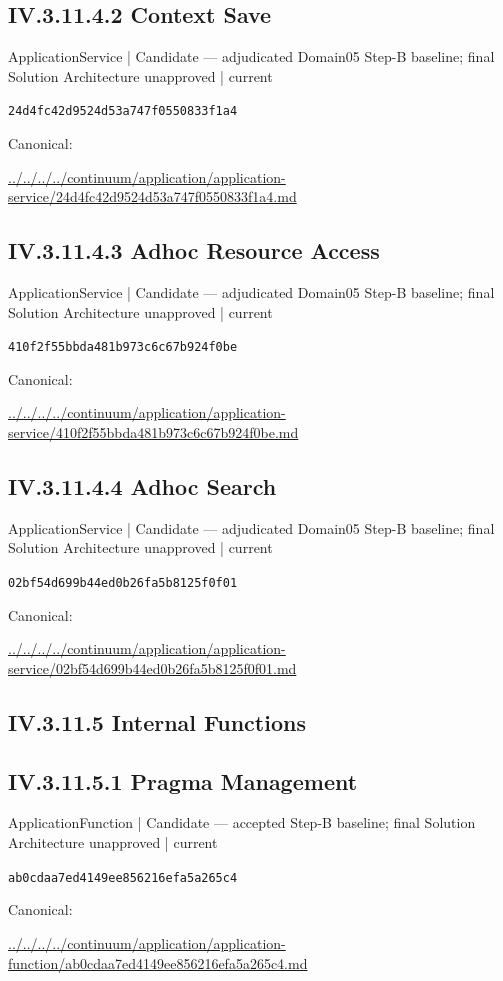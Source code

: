 \documentclass[10pt,a4paper]{article}
\begin{document}
\subsection*{IV.3.11.4.2 Context Save}
{\small ApplicationService | Candidate — adjudicated Domain05 Step-B baseline; final Solution Architecture unapproved | current}\par
\texttt{24d4fc42d9524d53a747f0550833f1a4}\par
Canonical: \par
{\footnotesize\url{../../../../continuum/application/application-service/24d4fc42d9524d53a747f0550833f1a4.md}}\par
\subsection*{IV.3.11.4.3 Adhoc Resource Access}
{\small ApplicationService | Candidate — adjudicated Domain05 Step-B baseline; final Solution Architecture unapproved | current}\par
\texttt{410f2f55bbda481b973c6c67b924f0be}\par
Canonical: \par
{\footnotesize\url{../../../../continuum/application/application-service/410f2f55bbda481b973c6c67b924f0be.md}}\par
\subsection*{IV.3.11.4.4 Adhoc Search}
{\small ApplicationService | Candidate — adjudicated Domain05 Step-B baseline; final Solution Architecture unapproved | current}\par
\texttt{02bf54d699b44ed0b26fa5b8125f0f01}\par
Canonical: \par
{\footnotesize\url{../../../../continuum/application/application-service/02bf54d699b44ed0b26fa5b8125f0f01.md}}\par
\subsection*{IV.3.11.5 Internal Functions}
\subsection*{IV.3.11.5.1 Pragma Management}
{\small ApplicationFunction | Candidate — accepted Step-B baseline; final Solution Architecture unapproved | current}\par
\texttt{ab0cdaa7ed4149ee856216efa5a265c4}\par
Canonical: \par
{\footnotesize\url{../../../../continuum/application/application-function/ab0cdaa7ed4149ee856216efa5a265c4.md}}\par
\end{document}
